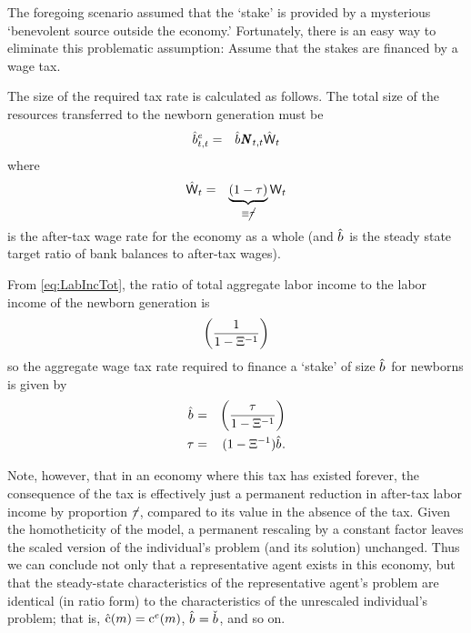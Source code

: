 \documentclass{handout}
\begin{document}
The foregoing scenario assumed that the `stake' is provided by a mysterious
`benevolent source outside the economy.'  Fortunately, there is an
easy way to eliminate this problematic assumption: Assume that the
stakes are financed by a wage tax.

The size of the required tax rate is calculated as follows.  The total size
of the resources transferred to the newborn generation must be
\begin{eqnarray}
  \hat{\bRat}^{e}_{t,t} & = & \hat{\bRat}^{\null} \PopLev_{t,t} \hat{\Wage}_{t}
\end{eqnarray}
where
\begin{eqnarray}
  \hat{\mathsf{W}}_{t} & = & \underbrace{\left(1-\tau \right)}_{\equiv \cancel{\tau}}\mathsf{W}_{t}
\end{eqnarray}
is the after-tax wage rate for the economy as a whole (and $\hat{b}^{\null}$ is the steady state target ratio of bank balances to after-tax wages).

From \eqref{eq:LabIncTot}, the ratio of total aggregate labor income 
to the labor income of the newborn generation is 
\begin{eqnarray}
  \left(\frac{1}{1-\Xi^{-1}}\right)
\end{eqnarray}
so the aggregate wage tax rate required to finance a `stake' of size $\hat{b}^{\null}$ for
newborns is given by 
\begin{eqnarray}
  \hat{b}^{\null} & = &   \left(\frac{\Tax}{1-\EmpGro^{-1}}\right)
\\ \Tax & = & (1-\EmpGro^{-1})\hat{b}^{\null}
.
\end{eqnarray}

Note, however, that in an economy where this tax has existed forever, the consequence
of the tax is effectively just a permanent reduction in after-tax labor income by proportion $\cancel{\tau}$, compared to its value in the absence of the tax.  
Given the homotheticity of the model, a permanent rescaling by a constant 
factor leaves the scaled version of the individual's problem (and its solution)
unchanged.  Thus we can conclude not only that a representative agent exists
in this economy, but that the steady-state characteristics of the 
representative agent's problem are identical (in ratio form) to the 
characteristics of the unrescaled individual's problem; that is, 
$\hat{\mathrm{c}}(m) = \mathrm{c}^{e}(m)$, $\hat{b}^{\null} = \bTarg^{\null}$, and so on.  
\end{document}
